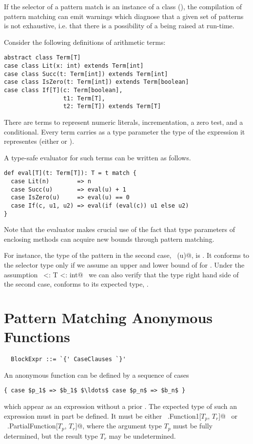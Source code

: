 If the selector of a pattern match is an instance of a
\lstinline@sealed@ class (), 
the compilation of pattern matching can emit warnings which diagnose
that a given set of patterns is not exhaustive, i.e. that there is a
possibility of a  being raised at run-time. 

\example\label{ex:eval}
 Consider the following definitions of arithmetic terms:

\begin{lstlisting}
abstract class Term[T]
case class Lit(x: int) extends Term[int]
case class Succ(t: Term[int]) extends Term[int]
case class IsZero(t: Term[int]) extends Term[boolean]
case class If[T](c: Term[boolean],
                 t1: Term[T],
                 t2: Term[T]) extends Term[T]
\end{lstlisting}
There are terms to represent numeric literals, incrementation, a zero
test, and a conditional. Every term carries as a type parameter the
type of the expression it representes (either  or ).

A type-safe evaluator for such terms can be written as follows.
\begin{lstlisting}
def eval[T](t: Term[T]): T = t match {
  case Lit(n)        => n
  case Succ(u)       => eval(u) + 1
  case IsZero(u)     => eval(u) == 0
  case If(c, u1, u2) => eval(if (eval(c)) u1 else u2)
}
\end{lstlisting}
Note that the evaluator makes crucial use of the fact that type
parameters of enclosing methods can acquire new bounds through pattern
matching.

For instance, the type of the pattern in the second case,
~\lstinline@Succ(u)@, is . It conforms to the selector type
 only if we assume an upper and lower bound of  for .
Under the assumption ~\lstinline@int <: T <: int@~ we can also
verify that the type right hand side of the second case, 
conforms to its expected type, .

\section{Pattern Matching Anonymous Functions}
\label{sec:pattern-closures}

\syntax\begin{lstlisting}
  BlockExpr ::= `{' CaseClauses `}'
\end{lstlisting}

An anonymous function can be defined by a sequence of cases 
\begin{lstlisting}
{ case $p_1$ => $b_1$ $\ldots$ case $p_n$ => $b_n$ }
\end{lstlisting}
which appear as an expression without a prior .  The
expected type of such an expression must in part be defined. It must
be either ~\lstinline@scala.Function1[$T_p$, $T_r$]@~
or ~\lstinline@scala.PartialFunction[$T_p$, $T_r$]@, where the
argument type $T_p$ must be fully determined, but the result type
$T_r$ may be undetermined.

